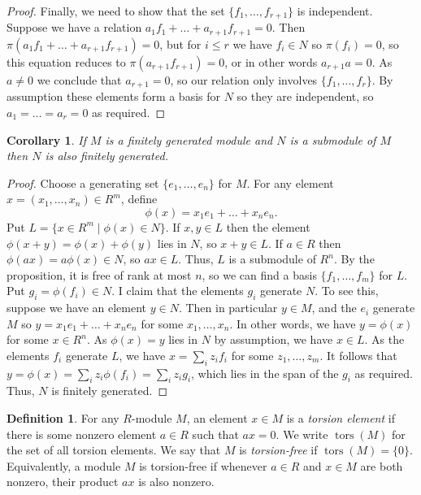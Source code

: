 \documentclass{amsart}
\newcommand{\tors}      {\operatorname{tors}}
\newcommand{\st}        {\;|\;}
\renewcommand{\:}{\colon}
\newtheorem{corollary}[theorem]{Corollary}
\theoremstyle{definition}
\newtheorem{definition}[theorem]{Definition}
\begin{document}
\begin{proof}
 Finally, we need to show that the set $\{f_1,\ldots,f_{r+1}\}$ is
 independent.  Suppose we have a relation
 $a_1f_1+\ldots+a_{r+1}f_{r+1}=0$.  Then
 $\pi(a_1f_1+\ldots+a_{r+1}f_{r+1})=0$, but for $i\leq r$ we have
 $f_i\in N$ so $\pi(f_i)=0$, so this equation reduces to
 $\pi(a_{r+1}f_{r+1})=0$, or in other words $a_{r+1}a=0$.  As
 $a\neq 0$ we conclude that $a_{r+1}=0$, so our relation only involves
 $\{f_1,\ldots,f_r\}$.  By assumption these elements form a basis for
 $N$ so they are independent, so $a_1=\ldots=a_r=0$ as required.
\end{proof}

\begin{corollary}\label{cor-Noetherian}
 If $M$ is a finitely generated module and $N$ is a submodule of $M$
 then $N$ is also finitely generated.
\end{corollary}
\begin{proof}
 Choose a generating set $\{e_1,\ldots,e_n\}$ for $M$.  For any
 element $x=(x_1,\ldots,x_n)\in R^m$, define 
 \[ \phi(x) = x_1 e_1 + \ldots + x_n e_n. \]
 Put $L=\{x\in R^m\st \phi(x)\in N\}$.  If $x,y\in L$ then the element
 $\phi(x+y)=\phi(x)+\phi(y)$ lies in $N$, so $x+y\in L$.  If $a\in R$
 then $\phi(ax)=a\phi(x)\in N$, so $ax\in L$.  Thus, $L$ is a
 submodule of $R^n$.  By the proposition, it is free of rank at most
 $n$, so we can find a basis $\{f_1,\ldots,f_m\}$ for $L$.  Put
 $g_i=\phi(f_i)\in N$.  I claim that the elements $g_i$ generate $N$.
 To see this, suppose we have an element $y\in N$.  Then in particular
 $y\in M$, and the $e_i$ generate $M$ so $y=x_1e_1+\ldots+x_ne_n$ for
 some $x_1,\ldots,x_n$.  In other words, we have $y=\phi(x)$ for some
 $x\in R^n$.  As $\phi(x)=y$ lies in $N$ by assumption, we have
 $x\in L$.  As the elements $f_i$ generate $L$, we have
 $x=\sum_iz_if_i$ for some $z_1,\ldots,z_m$.  It follows that
 $y=\phi(x)=\sum_iz_i\phi(f_i)=\sum_iz_ig_i$, which lies in the span
 of the $g_i$ as required.  Thus, $N$ is finitely generated.
\end{proof}

\begin{definition}\label{defn-torsion}
 For any $R$-module $M$, an element $x\in M$ is a \emph{torsion
 element} if there is some nonzero element $a\in R$ such that $ax=0$.
 We write $\tors(M)$ for the set of all torsion elements.  We say that
 $M$ is \emph{torsion-free} if $\tors(M)=\{0\}$.  Equivalently, a
 module $M$ is torsion-free if whenever $a\in R$ and $x\in M$ are both
 nonzero, their product $ax$ is also nonzero.
\end{definition}
\end{document}
